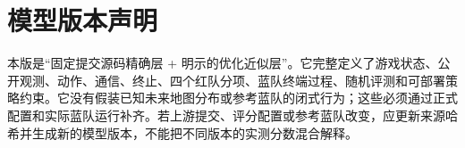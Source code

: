 \documentclass[UTF8,11pt]{ctexart}
\begin{document}
\section*{模型版本声明}

本版是“固定提交源码精确层 + 明示的优化近似层”。它完整定义了游戏状态、公开观测、动作、通信、终止、四个红队分项、蓝队终端过程、随机评测和可部署策略约束。它没有假装已知未来地图分布或参考蓝队的闭式行为；这些必须通过正式配置和实际蓝队运行补齐。若上游提交、评分配置或参考蓝队改变，应更新来源哈希并生成新的模型版本，不能把不同版本的实测分数混合解释。
\end{document}
